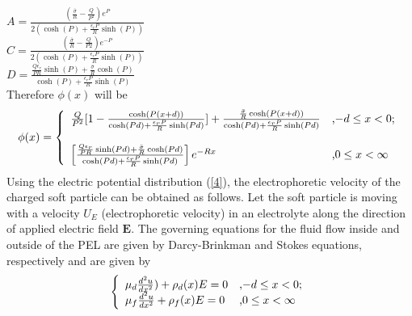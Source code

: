 \documentclass[11 pt]{article}
\begin{document}
$A=\frac{(\frac{\bar \sigma}{R}-\frac{Q}{{P}^{2}}){e}^{P}}{2(\cosh(P)+\frac{\epsilon_{r}P}{R}\sinh(P))}$ \\ $C=\frac{(\frac{\bar \sigma}{R}-\frac{Q}{{P}^{}2}){e}^{-P}}{2(\cosh(P)+\frac{\epsilon_{r}P}{R}\sinh(P))}$\\

  $ D=\frac{\frac{Q\epsilon_{r}}{PR}\sinh(P)+\frac{\bar \sigma}{R}\cosh(P)}{\cosh(P)+\frac{\epsilon_{r}P}{R}\sinh(P)} $ \\

Therefore $\phi(x)$ will be \\

\begin{equation}
 \phi(x)=
  \left\{
\begin{array}{ll}
  \frac{Q}{{P}^{2}}[1-\frac{\cosh(P(x+d))}{\cosh(Pd)+\frac{\epsilon_{r}P}{R}\sinh(Pd)}] +\frac{\frac{\bar \sigma}{R}\cosh(P(x+d))}{\cosh(Pd)+\frac{\epsilon_{r}P}{R}\sinh(Pd)}                                                                                                                      & \hbox{,$-d \le x <0;$} \\ \\
 \left[\frac{\frac{Q\epsilon_{r}}{PR}\sinh(Pd)+\frac{\bar \sigma}{R}\cosh(Pd)}{\cosh(Pd)+\frac{\epsilon_{r}P}{R}\sinh(Pd)}\right] e^{-Rx} & \hbox{,$0 \le x <\infty$} \\



                                                                  \end{array}
                                                                 \right.
                                                                 \label{10}
 \end{equation}
Using the  electric potential distribution (\ref{4}), the electrophoretic velocity of the charged soft particle can be obtained as follows. Let the soft particle is moving with a velocity $U_E$ (electrophoretic velocity)  in an electrolyte  along the direction of applied electric field $\textbf{E}$. The governing equations for the fluid flow inside and outside of the PEL are given by Darcy-Brinkman and Stokes  equations, respectively and are given by
 \begin{equation}
 \left\{
                                                                  \begin{array}{ll}
  \mu_{d} \frac{d^{2} u}{d x^{2}})+\rho_d(x) E=0                  & \hbox{,$-d \le x <0$;} \\

   \mu_{f}\frac{d^{2} u}{d x^{2}}+\rho_{f}(x) E=0                              & \hbox{,$0 \le x <\infty$} \\
                                                                  \end{array}
                                                                 \right.
                                                               \label{11}
\end{equation}
\end{document}
